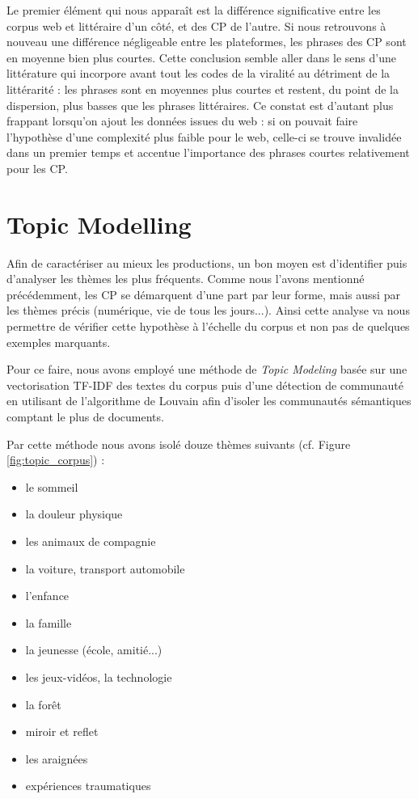 \documentclass[12pt,a4paper,oneside,titlepage]{book} %
\begin{document}
	Le premier élément qui nous apparaît est la différence significative entre les corpus web et littéraire d'un côté, et des CP de l'autre. Si nous retrouvons à nouveau une différence négligeable entre les plateformes, les phrases des CP sont en moyenne bien plus courtes. 
	Cette conclusion semble aller dans le sens d'une littérature qui incorpore avant tout les codes de la viralité au détriment de la littérarité : les phrases sont en moyennes plus courtes et restent, du point de la dispersion, plus basses que les phrases littéraires. Ce constat est d'autant plus frappant lorsqu'on ajout les données issues du web : si on pouvait faire l'hypothèse d'une complexité plus faible pour le web, celle-ci se trouve invalidée dans un premier temps et accentue l'importance des phrases courtes relativement pour les CP.


	\section{Topic Modelling}
	\label{section_topic}
	
	Afin de caractériser au mieux les productions, un bon moyen est d'identifier puis d'analyser les thèmes les plus fréquents. Comme nous l'avons mentionné précédemment, les CP se démarquent d'une part par leur forme, mais aussi par les thèmes précis (numérique, vie de tous les jours...). Ainsi cette analyse va nous permettre de vérifier cette hypothèse à l'échelle du corpus et non pas de quelques exemples marquants. 

	Pour ce faire, nous avons employé une méthode de \emph{Topic Modeling} basée sur une vectorisation TF-IDF des textes du corpus puis d'une détection de communauté en utilisant de l'algorithme de Louvain afin d'isoler les communautés sémantiques comptant le plus de documents. 
	
	Par cette méthode nous avons isolé douze thèmes suivants (cf. Figure \ref{fig:topic_corpus}) : 
	\begin{itemize}
		\item le sommeil
		\item la douleur physique
		\item les animaux de compagnie
		\item la voiture, transport automobile
		\item l'enfance
		\item la famille
		\item la jeunesse (école, amitié...)
		\item les jeux-vidéos, la technologie
		\item la forêt
		\item miroir et reflet
		\item les araignées
		\item expériences traumatiques\\

		\end{itemize}
\end{document}
